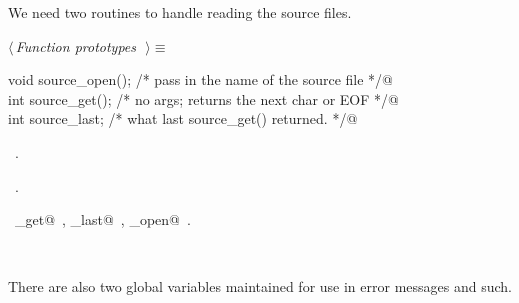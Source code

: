 \documentclass{report}
\begin{document}
We need two routines to handle reading the source files.
\begin{flushleft} \small
\begin{minipage}{\linewidth} \label{scrap134}
$\langle\,${\it Function prototypes}\nobreak\ {\footnotesize {}}$\,\rangle\equiv$
\vspace{-1ex}
\begin{list}{}{} \item
\mbox{}\verb@extern void source_open(); /* pass in the name of the source file */@\\
\mbox{}\verb@extern int source_get();   /* no args; returns the next char or EOF */@\\
\mbox{}\verb@extern int source_last;   /* what last source_get() returned. */@\\
\mbox{}\verb@@{\NWsep}
\end{list}
\vspace{-1ex}
\footnotesize\addtolength{\baselineskip}{-1ex}
\begin{list}{}{\setlength{\itemsep}{-\parsep}\setlength{\itemindent}{-\leftmargin}}
\item \NWtxtMacroDefBy\ .
\item \NWtxtMacroRefIn\ .
\end{list}
\vspace{-2ex}
\footnotesize\addtolength{\baselineskip}{-1ex}
\begin{list}{}{\setlength{\itemsep}{-\parsep}\setlength{\itemindent}{-\leftmargin}}
\item \NWtxtIdentsUsed\nobreak\  \verb@source_get@\nobreak\ , \verb@source_last@\nobreak\ , \verb@source_open@\nobreak\ .\end{list}
\end{minipage}\\[4ex]
\end{flushleft}
There are also two global variables maintained for use in error
messages and such.
\end{document}
